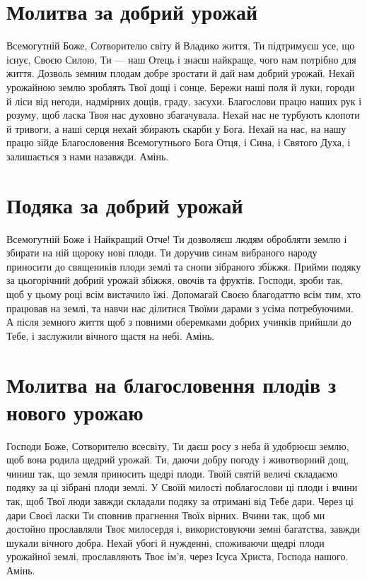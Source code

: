 \documentclass[chapters.tex]{subfiles}
\begin{document}
\section{Молитва за добрий урожай}
Всемогутній Боже, Сотворителю світу й Владико життя, Ти підтримуєш усе, що існує, Своєю Силою, Ти — наш Отець і знаєш найкраще, чого нам потрібно для життя. Дозволь земним плодам добре зростати й дай нам добрий урожай. Нехай урожайною землю зроблять Твої дощі і сонце. Бережи наші поля й луки, городи й ліси від негоди, надмірних дощів, граду, засухи. Благослови працю наших рук і розуму, щоб ласка Твоя нас духовно збагачувала. Нехай нас не турбують клопоти й тривоги, а наші серця нехай збирають скарби у Бога. Нехай на нас, на нашу працю зійде Благословення Всемогутнього Бога Отця, і Сина, і Святого Духа, і залишається з нами назавжди. Амінь.

\section{Подяка за добрий урожай}
Всемогутній Боже і Найкращий Отче! Ти дозволяєш людям обробляти землю і збирати на ній щороку нові плоди. Ти доручив синам вибраного народу приносити до священиків плоди землі та снопи зібраного збіжжя. Прийми подяку за цьогорічний добрий урожай збіжжя, овочів та фруктів. Господи, зроби так, щоб у цьому році всім вистачило їжі. Допомагай Своєю благодаттю всім тим, хто працював на землі, та навчи нас ділитися Твоїми дарами з усіма потребуючими. А після земного життя щоб з повними оберемками добрих учинків прийшли до Тебе, і заслужили вічного щастя на небі. Амінь.

\section{Молитва на благословення плодів з нового урожаю}
Господи Боже, Сотворителю всесвіту, Ти даєш росу з неба й удобрюєш землю, щоб вона родила щедрий урожай. Ти, даючи добру погоду і животворний дощ, чиниш так, що земля приносить щедрі плоди. Твоїй святій величі складаємо подяку за ці зібрані плоди землі. У Своїй милості поблагослови ці плоди і вчини так, щоб Твої люди завжди складали подяку за отримані від Тебе дари. Через ці дари Своєї ласки Ти сповнив прагнення Твоїх вірних. Вчини так, щоб ми достойно прославляли Твоє милосердя і, використовуючи земні багатства, завжди шукали вічного добра. Нехай убогі й нужденні, споживаючи щедрі плоди урожайної землі, прославляють Твоє ім’я, через Ісуса Христа, Господа нашого. Амінь.
\end{document}
